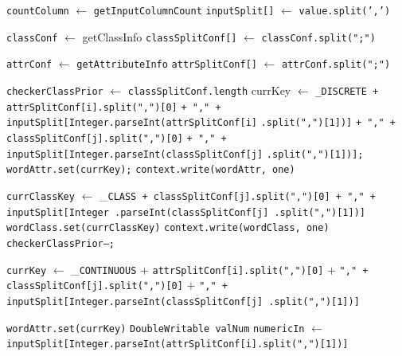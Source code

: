 \begin{enumerate}
\begin{algorithm}[H]
\begin{algorithmic}[1]
\State \texttt{countColumn} $\gets$ \texttt{getInputColumnCount}
\State \texttt{inputSplit[]} $\gets$ \texttt{value.split(',')}
	\State \Return
\EndIf

\State \texttt{classConf} $\gets$ getClassInfo 
\State \texttt{classSplitConf[]} $\gets$ \texttt{classConf.split(";")}

\State \texttt{attrConf} $\gets$ \texttt{getAttributeInfo} 
\State \texttt{attrSplitConf[]} $\gets$ \texttt{attrConf.split(";")}

\State \texttt{checkerClassPrior} $\gets$ \texttt{classSplitConf.length}
{}	
			\State currKey $ \gets $ \verb|_|\texttt{DISCRETE + attrSplitConf[i].split(",")[0]}
              \texttt{+ "," + inputSplit[Integer.parseInt(attrSplitConf[i]}
              \texttt{.split(",")[1])]}
              \texttt{+ "," + classSplitConf[j].split(",")[0]}
              \texttt{+ "," + inputSplit[Integer.parseInt(classSplitConf[j]}
              \texttt{.split(",")[1])];}
          	\State \texttt{wordAttr.set(currKey);}
          	\State \texttt{context.write(wordAttr, one)}

          	\State \texttt{currClassKey} $\gets$ \_\texttt{CLASS + classSplitConf[j].split(",")[0] + "," + inputSplit[Integer .parseInt(classSplitConf[j] .split(",")[1])]}
          	\State \texttt{wordClass.set(currClassKey)}
          	\State \texttt{context.write(wordClass, one)}
          	\State \texttt{checkerClassPrior--;}
          \EndIf          	
          	
		\EndFor

            \State \texttt{currKey} $\gets$ \_\texttt{CONTINUOUS} $+$ \texttt{attrSplitConf[i].split(",")[0]} $+$ \texttt{"," + classSplitConf[j].split(",")[0]} $+$ \texttt{"," + inputSplit[Integer.parseInt(classSplitConf[j]
              .split(",")[1])]}  		
              
            \State \texttt{wordAttr.set(currKey)}
          	\State \texttt{DoubleWritable valNum}
          	\State \texttt{numericIn} $\gets$ \texttt{inputSplit[Integer.parseInt(attrSplitConf[i].split(",")[1])]}
          	

\end{algorithmic}
\end{algorithm}
\end{enumerate}
